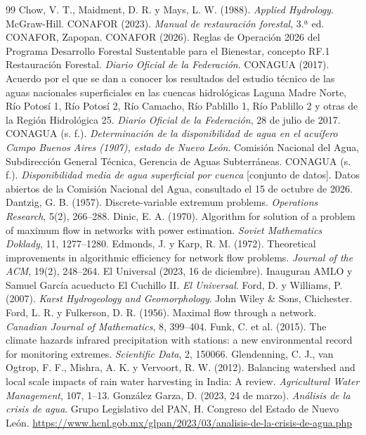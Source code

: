 \begin{thebibliography}{99}
 Chow, V. T., Maidment, D. R. y Mays, L. W. (1988). \emph{Applied Hydrology}. McGraw-Hill.
 CONAFOR (2023). \emph{Manual de restauración forestal}, 3.ª ed. CONAFOR, Zapopan.
 CONAFOR (2026). Reglas de Operación 2026 del Programa Desarrollo Forestal Sustentable para el Bienestar, concepto RF.1 Restauración Forestal. \emph{Diario Oficial de la Federación}.
 CONAGUA (2017). Acuerdo por el que se dan a conocer los resultados del estudio técnico de las aguas nacionales superficiales en las cuencas hidrológicas Laguna Madre Norte, Río Potosí 1, Río Potosí 2, Río Camacho, Río Pablillo 1, Río Pablillo 2 y otras de la Región Hidrológica 25. \emph{Diario Oficial de la Federación}, 28 de julio de 2017.
 CONAGUA (s. f.). \emph{Determinación de la disponibilidad de agua en el acuífero Campo Buenos Aires (1907), estado de Nuevo León}. Comisión Nacional del Agua, Subdirección General Técnica, Gerencia de Aguas Subterráneas.
 CONAGUA (s. f.). \emph{Disponibilidad media de agua superficial por cuenca} [conjunto de datos]. Datos abiertos de la Comisión Nacional del Agua, consultado el 15 de octubre de 2026.
 Dantzig, G. B. (1957). Discrete-variable extremum problems. \emph{Operations Research}, 5(2), 266–288.
 Dinic, E. A. (1970). Algorithm for solution of a problem of maximum flow in networks with power estimation. \emph{Soviet Mathematics Doklady}, 11, 1277–1280.
 Edmonds, J. y Karp, R. M. (1972). Theoretical improvements in algorithmic efficiency for network flow problems. \emph{Journal of the ACM}, 19(2), 248–264.
 El Universal (2023, 16 de diciembre). Inauguran AMLO y Samuel García acueducto El Cuchillo II. \emph{El Universal}.
 Ford, D. y Williams, P. (2007). \emph{Karst Hydrogeology and Geomorphology}. John Wiley \& Sons, Chichester.
 Ford, L. R. y Fulkerson, D. R. (1956). Maximal flow through a network. \emph{Canadian Journal of Mathematics}, 8, 399–404.
 Funk, C. et al. (2015). The climate hazards infrared precipitation with stations: a new environmental record for monitoring extremes. \emph{Scientific Data}, 2, 150066.
 Glendenning, C. J., van Ogtrop, F. F., Mishra, A. K. y Vervoort, R. W. (2012). Balancing watershed and local scale impacts of rain water harvesting in India: A review. \emph{Agricultural Water Management}, 107, 1–13.
 González Garza, D. (2023, 24 de marzo). \emph{Análisis de la crisis de agua}. Grupo Legislativo del PAN, H. Congreso del Estado de Nuevo León. \url{https://www.hcnl.gob.mx/glpan/2023/03/analisis-de-la-crisis-de-agua.php}

\end{thebibliography}
